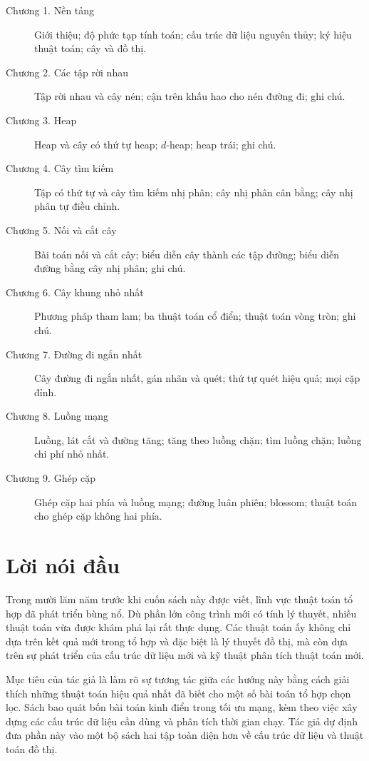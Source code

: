 \documentclass[11pt]{article}
\begin{document}
\begin{description}
  \item[Chương 1. Nền tảng]
  Giới thiệu; độ phức tạp tính toán; cấu trúc dữ liệu nguyên thủy; ký hiệu
  thuật toán; cây và đồ thị.

  \item[Chương 2. Các tập rời nhau]
  Tập rời nhau và cây nén; cận trên khấu hao cho nén đường đi; ghi chú.

  \item[Chương 3. Heap]
  Heap và cây có thứ tự heap; \(d\)-heap; heap trái; ghi chú.

  \item[Chương 4. Cây tìm kiếm]
  Tập có thứ tự và cây tìm kiếm nhị phân; cây nhị phân cân bằng; cây nhị phân
  tự điều chỉnh.

  \item[Chương 5. Nối và cắt cây]
  Bài toán nối và cắt cây; biểu diễn cây thành các tập đường; biểu diễn đường
  bằng cây nhị phân; ghi chú.

  \item[Chương 6. Cây khung nhỏ nhất]
  Phương pháp tham lam; ba thuật toán cổ điển; thuật toán vòng tròn; ghi chú.

  \item[Chương 7. Đường đi ngắn nhất]
  Cây đường đi ngắn nhất, gán nhãn và quét; thứ tự quét hiệu quả; mọi cặp
  đỉnh.

  \item[Chương 8. Luồng mạng]
  Luồng, lát cắt và đường tăng; tăng theo luồng chặn; tìm luồng chặn; luồng
  chi phí nhỏ nhất.

  \item[Chương 9. Ghép cặp]
  Ghép cặp hai phía và luồng mạng; đường luân phiên; blossom; thuật toán cho
  ghép cặp không hai phía.
\end{description}

\section{Lời nói đầu}

Trong mười lăm năm trước khi cuốn sách này được viết, lĩnh vực thuật toán tổ
hợp đã phát triển bùng nổ. Dù phần lớn công trình mới có tính lý thuyết,
nhiều thuật toán vừa được khám phá lại rất thực dụng. Các thuật toán ấy không
chỉ dựa trên kết quả mới trong tổ hợp và đặc biệt là lý thuyết đồ thị, mà còn
dựa trên sự phát triển của cấu trúc dữ liệu mới và kỹ thuật phân tích thuật
toán mới.

Mục tiêu của tác giả là làm rõ sự tương tác giữa các hướng này bằng cách giải
thích những thuật toán hiệu quả nhất đã biết cho một số bài toán tổ hợp chọn
lọc. Sách bao quát bốn bài toán kinh điển trong tối ưu mạng, kèm theo việc xây
dựng các cấu trúc dữ liệu cần dùng và phân tích thời gian chạy. Tác giả dự
định đưa phần này vào một bộ sách hai tập toàn diện hơn về cấu trúc dữ liệu và
thuật toán đồ thị.
\end{document}
